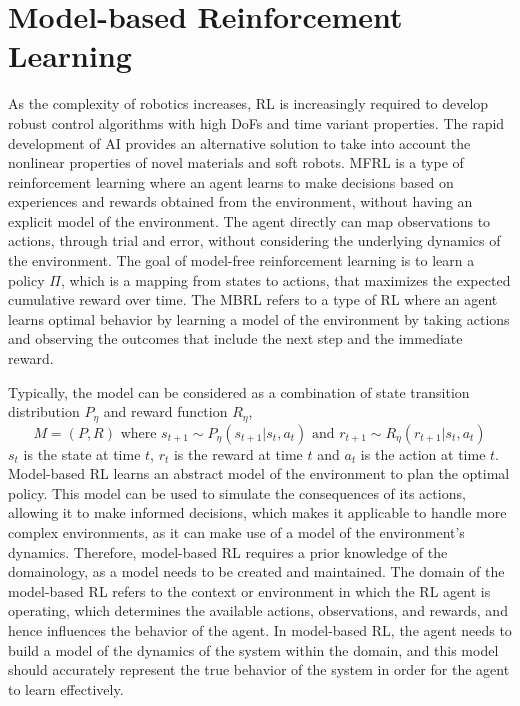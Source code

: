 \section{Model-based Reinforcement Learning}
As the complexity of robotics increases, \ac{RL} is increasingly required to develop robust control algorithms with high \ac{DoF}s and time variant properties\cite{zhangEffectiveSoftRobot2017}. The rapid development of AI provides an alternative solution to take into account the nonlinear properties of novel materials and soft robots\cite{tangModelbasedOnlineLearning2021}. \ac{MFRL} is a type of reinforcement learning where an agent learns to make decisions based on experiences and rewards obtained from the environment, without having an explicit model of the environment. The agent directly can map observations to actions, through trial and error, without considering the underlying dynamics of the environment\cite{arulkumaranDeepReinforcementLearning2017}. The goal of model-free reinforcement learning is to learn a policy $\Pi$, which is a mapping from states to actions, that maximizes the expected cumulative reward over time. The \ac{MBRL} refers to a type of \ac{RL} where an agent learns optimal behavior by learning a model of the environment by taking actions and observing the outcomes that include the next step and the immediate reward\cite{rayModelBasedReinforcementLearning2010}. 


Typically, the model can be considered as a combination of state transition distribution $P_\eta$ and reward function $R_\eta$, $$M = (P,R) \textrm{ where } s_{t+1}\sim P_\eta(s_{t+1}|s_t, a_t) \textrm{ and } r_{t+1}\sim R_\eta(r_{t+1}|s_t, a_t)$$ $s_t$ is the state at time $t$, $r_t$ is the reward at time $t$ and $a_t$ is the action at time $t$. Model-based \ac{RL} learns an abstract model of the environment to plan the optimal policy. This model can be used to simulate the consequences of its actions, allowing it to make informed decisions, which makes it applicable to handle more complex environments, as it can make use of a model of the environment's dynamics. Therefore, model-based \ac{RL} requires a prior knowledge of the domainology\cite{tangModelbasedOnlineLearning2021}, as a model needs to be created and maintained. The domain of the model-based \ac{RL} refers to the context or environment in which the \ac{RL} agent is operating, which determines the available actions, observations, and rewards, and hence influences the behavior of the agent\cite{langExplorationRelationalDomains}. In model-based \ac{RL}, the agent needs to build a model of the dynamics of the system within the domain, and this model should accurately represent the true behavior of the system in order for the agent to learn effectively.
